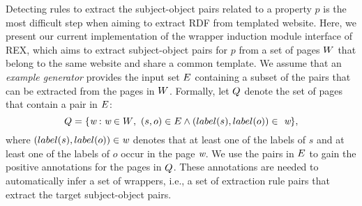 \newcommand{\type}[1]{\mbox{\em \ensuremath{#1}}}

\newcommand{\dalvi}{DBLP:journals/pvldb/DalviKS11}
\newcommand{\mdl}{DBLP:journals/corr/math-ST-0406077}
\newcommand{\lixto}{DBLP:conf/pods/GottlobKBHF04}
\newcommand{\angluin}{DBLP:journals/tcs/Angluin04}
\newcommand{\myjacm}{DBLP:journals/jacm/CrescenziM04}
\newcommand{\SL}{DBLP:journals/tnn/Vapnik99}
\newcommand{\srm}{DBLP:journals/tit/Shawe-TaylorBWA98}
\newcommand{\ALsurvey}{settles.tr09}



Detecting rules to extract the subject-object pairs related to a property $p$ is the most difficult step when aiming to extract \ac{RDF} from templated website.
Here, we present our current implementation of the wrapper induction module interface of REX, which aims to extract subject-object pairs for $p$ from a set of pages $\mbox{\ensuremath{W}}$ that belong to the same website and share a common template.
We assume that an \emph{example generator} provides the input set ${\mbox{\ensuremath{E}}}$ containing a subset of the pairs that can be extracted from the pages in $\mbox{\ensuremath{W}}$. 
Formally,  let $\mbox{\ensuremath{Q}}$ denote the set of pages that contain a pair in $\mbox{\ensuremath{E}}$:
\begin{equation}
 \mbox{\ensuremath{Q}} = \{\mbox{\em w}: \mbox{\em w} \in \mbox{\ensuremath{W}},\ (s, o)\in {\mbox{\ensuremath{E}}} \wedge (label(s),label(o)) \in\ \mbox{\em w}\},
\end{equation}
where  $(label(s),label(o)) \in \mbox{\em w}$ denotes that at least one of the labels of $s$ and at least one of the labels of $o$ occur in the page $\mbox{\em w}$. %
We use the pairs in ${\mbox{\ensuremath{E}}}$ to gain the positive annotations for the pages in $\mbox{\ensuremath{Q}}$. These  annotations are needed to automatically infer a set of wrappers, i.e., a set of extraction rule pairs that extract the target subject-object pairs.


